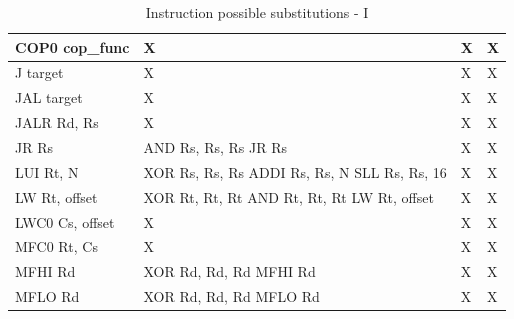\documentclass[a4paper,twoside]{article}
\theoremstyle{definition}
\theoremstyle{remark}
\begin{document}
\begin{table}[H]
\begin{tabular}{|p{}|p{}|p{}|p{}|}
COP0 cop\_func&X &	X & X \\  \hline
J target &X &		X & X \\  \hline
JAL target &X &	X & X  \\  \hline
JALR Rd, Rs&X &	X & X  \\  \hline
JR Rs& AND Rs, Rs, Rs \newline
       JR Rs&		X & X  \\  \hline
LUI Rt, N&XOR Rs, Rs, Rs\newline
          ADDI Rs, Rs, N
          SLL Rs, Rs, 16 &	X & X \\  \hline
LW Rt, offset& XOR Rt, Rt, Rt\newline
               AND Rt, Rt, Rt\newline
               LW Rt, offset& 	X & X \\  \hline
LWC0 Cs, offset&X &	X & X  \\  \hline
MFC0 Rt, Cs&X &	X & X  \\  \hline
MFHI Rd& XOR Rd, Rd, Rd \newline
         MFHI Rd &	X & X  \\  \hline
MFLO Rd& XOR Rd, Rd, Rd \newline
         MFLO Rd &	X & X  \\  \hline
\end{tabular}
\caption{Instruction possible substitutions - I}
\end{table}
\end{document}
